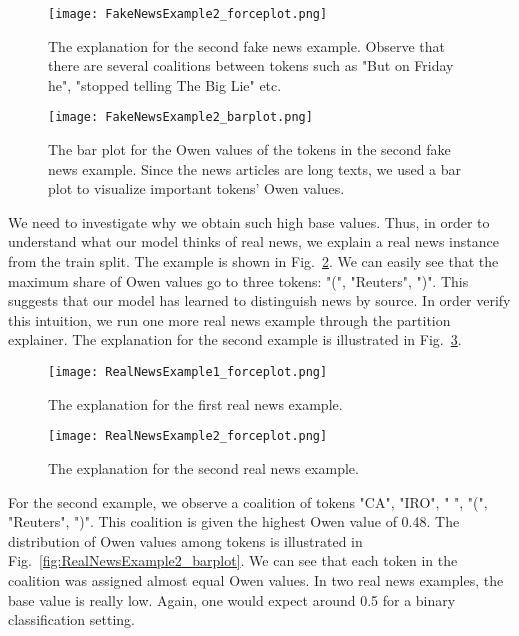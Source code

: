 \begin{figure}
    \centering
    \texttt{[image: FakeNewsExample2\_forceplot.png]}
    \caption[The explanation for the second fake news example.]{The explanation for the second fake news example. Observe that there are several coalitions between tokens such as "But on Friday he", "stopped telling The Big Lie" etc.}
    \label{fig:FakeNewsExample2_forceplot}
\end{figure}
\begin{figure}
    \centering
    \texttt{[image: FakeNewsExample2\_barplot.png]}
    \caption[The bar plot for the Owen values of the tokens in the second fake news example.]{The bar plot for the Owen values of the tokens in the second fake news example.  Since the news articles are long texts, we used a bar plot to visualize important tokens' Owen values.}
\end{figure}
We need to investigate why we obtain such high base values. Thus, in order to understand what our model thinks of real news, we explain a real news instance from the train split. The example is shown in Fig.~\ref{fig:RealNewsExample1_forceplot}. We can easily see that the maximum share of Owen values go to three tokens: "(", "Reuters", ")". This suggests that our model has learned to distinguish news by source. In order verify this intuition, we run one more real news example through the partition explainer. The explanation for the second example is illustrated in Fig.~\ref{fig:RealNewsExample2_forceplot}.\\
\begin{figure}
    \centering
    \texttt{[image: RealNewsExample1\_forceplot.png]}
    \caption[The explanation for the first real news example.]{The explanation for the first real news example.}
    \label{fig:RealNewsExample1_forceplot}
\end{figure}
\begin{figure}
    \centering
    \texttt{[image: RealNewsExample2\_forceplot.png]}
    \caption[The explanation for the second real news example.]{The explanation for the second real news example.}
    \label{fig:RealNewsExample2_forceplot}
\end{figure}
For the second example, we observe a coalition of tokens "CA", "IRO", " ", "(", "Reuters", ")". This coalition is given the highest Owen value of 0.48. The distribution of Owen values among tokens is illustrated in Fig.~\ref{fig:RealNewsExample2_barplot}. We can see that each token in the coalition was assigned almost equal Owen values. In two real news examples, the base value is really low. Again, one would expect around 0.5 for a binary classification setting.
